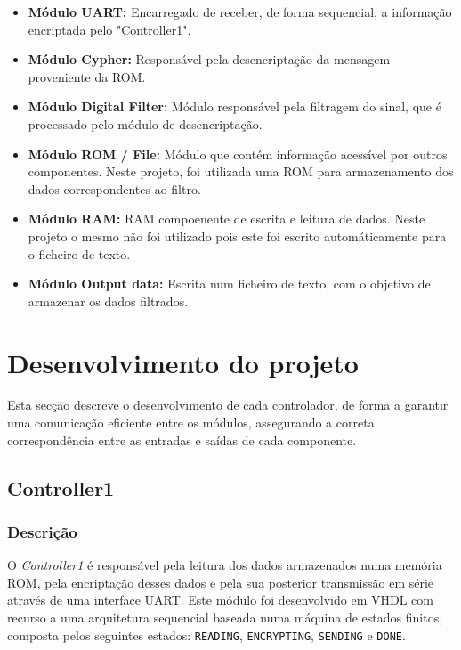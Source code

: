 \documentclass[12pt, a4paper]{article}
\begin{document}
\begin{itemize}
    \item \textbf{Módulo UART:} Encarregado de receber, de forma sequencial, a informação encriptada pelo "Controller1".

    \item \textbf{Módulo Cypher:} Responsável pela desencriptação da mensagem proveniente da ROM.
    \item \textbf{Módulo Digital Filter:} Módulo responsável pela filtragem do sinal, que é processado pelo módulo de desencriptação.\\

    \item \textbf{Módulo ROM / File:} Módulo que contém informação acessível por outros componentes.  
    Neste projeto, foi utilizada uma ROM para armazenamento dos dados correspondentes ao filtro.

    \item \textbf{Módulo RAM:} RAM compoenente de escrita e leitura de dados. Neste projeto o mesmo não foi utilizado pois este foi escrito automáticamente para o ficheiro de texto.\\

    \item \textbf{Módulo Output data:} Escrita num ficheiro de texto, com o objetivo de armazenar os dados filtrados.\\
    
\end{itemize}

\newpage

\section{Desenvolvimento do projeto}
Esta secção descreve o desenvolvimento de cada controlador, de forma a garantir uma comunicação eficiente entre os módulos, assegurando a correta correspondência entre as entradas e saídas de cada componente.

\subsection{Controller1}
\subsubsection{Descrição}
O \textit{Controller1} é responsável pela leitura dos dados armazenados numa memória ROM, pela encriptação desses dados e pela sua posterior transmissão em série através de uma interface UART.  
Este módulo foi desenvolvido em VHDL com recurso a uma arquitetura sequencial baseada numa máquina de estados finitos, composta pelos seguintes estados: \texttt{READING}, \texttt{ENCRYPTING}, \texttt{SENDING} e \texttt{DONE}.\\
\end{document}
